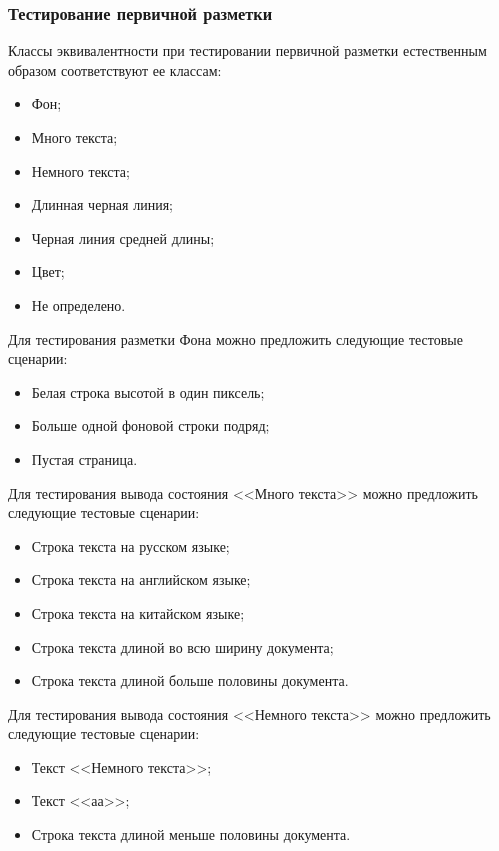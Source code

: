 \subsubsection{Тестирование первичной разметки}

Классы эквивалентности при тестировании первичной разметки естественным образом соответствуют ее классам:
\begin{itemize}
    \item Фон;
    \item Много текста;
    \item Немного текста;
    \item Длинная черная линия;
    \item Черная линия средней длины;
    \item Цвет;
    \item Не определено.
\end{itemize}

Для тестирования разметки Фона можно предложить следующие тестовые сценарии:
\begin{itemize}
    \item Белая строка высотой в один пиксель;
    \item Больше одной фоновой строки подряд;
    \item Пустая страница.
\end{itemize}

Для тестирования вывода состояния <<Много текста>> можно предложить следующие тестовые сценарии:
\begin{itemize}
    \item Строка текста на русском языке;
    \item Строка текста на английском языке;
    \item Строка текста на китайском языке;
    \item Строка текста длиной во всю ширину документа;
    \item Строка текста длиной больше половины документа.
\end{itemize}

Для тестирования вывода состояния <<Немного текста>> можно предложить следующие тестовые сценарии:
\begin{itemize}
    \item Текст <<Немного текста>>;
    \item Текст <<аа>>;
    \item Строка текста длиной меньше половины документа.
\end{itemize}


